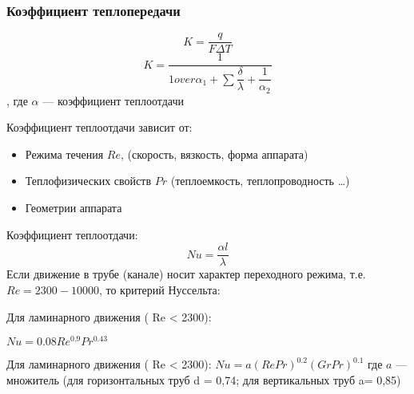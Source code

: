 \begin{frame}
	\frametitle{Коэффициент теплопередачи}
	\begin{equation}
		K = \dfrac {q}  { F \Delta T }
	\end{equation}
	\begin{equation}
		K = \dfrac {1} { 1 over {\alpha_1} + \sum{\dfrac {\delta} {\lambda}} + \dfrac {1} {\alpha_2} }
	\end{equation}
	, где $\alpha$ --- коэффициент теплоотдачи
	
	Коэффициент теплоотдачи зависит от:
	\begin{itemize}
		\item Режима течения $Re$, (скорость, вязкость, форма аппарата)
		\item Теплофизических свойств $Pr$ (теплоемкость, теплопроводность …)
		\item Геометрии аппарата
	\end{itemize}
	
\end{frame}

\begin{frame}
	Коэффициент теплоотдачи:
	\begin{equation}
		Nu = \dfrac { \alpha l } {\lambda}
	\end{equation}
	Если движение в трубе (канале) носит характер переходного режима, т.е. $Re = 2300 - 10000$, то критерий Нуссельта:
	
	Для ламинарного движения ( Re < 2300):
	
	$Nu = 0.08 Re^{0.9} Pr^{0.43}$
	
	Для ламинарного движения ( Re < 2300):
	$Nu =a ( Re Pr )^{0.2} ( Gr Pr )^{0.1}$
	где $a$ --- множитель (для горизонтальных труб d = 0,74; для вертикальных труб a= 0,85)
\end{frame}